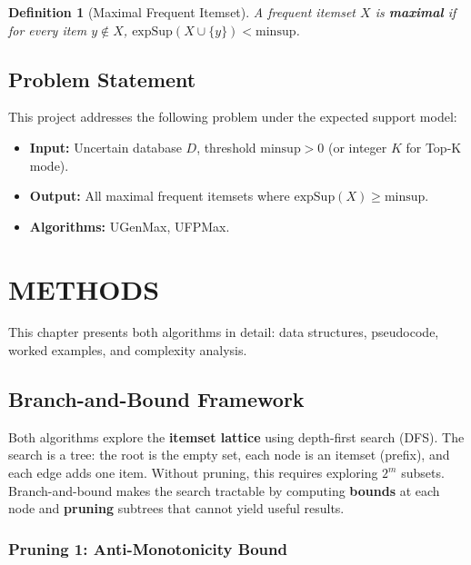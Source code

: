 \documentclass[12pt,a4paper]{report}
\newtheorem{definition}{Definition}[chapter]
\begin{document}
  \begin{definition}[Maximal Frequent Itemset]
A frequent itemset $X$ is \textbf{maximal} if for every item $y \notin X$, $\text{expSup}(X \cup \{y\}) < \text{minsup}$.
  \end{definition}

  \section{Problem Statement}

  This project addresses the following problem under the expected support model:

  \begin{itemize}
    \item \textbf{Input:} Uncertain database $D$, threshold $\text{minsup} > 0$ (or integer $K$ for Top-K mode).
    \item \textbf{Output:} All maximal frequent itemsets where $\text{expSup}(X) \geq \text{minsup}$.
    \item \textbf{Algorithms:} UGenMax, UFPMax.
  \end{itemize}

  \chapter{METHODS}

  This chapter presents both algorithms in detail: data structures, pseudocode, worked examples, and complexity analysis.

  \section{Branch-and-Bound Framework}

  Both algorithms explore the \textbf{itemset lattice} using depth-first search (DFS). The search is a tree: the root is the empty set, each node is an itemset (prefix), and each edge adds one item. Without pruning, this requires exploring $2^m$ subsets. Branch-and-bound makes the search tractable by computing \textbf{bounds} at each node and \textbf{pruning} subtrees that cannot yield useful results.

  \subsection{Pruning 1: Anti-Monotonicity Bound}
\end{document}
